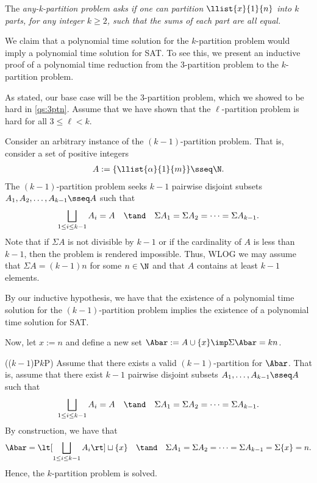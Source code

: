 \documentclass{article}
\begin{document}

\begin{subexercise}
  The \it{any-k-partition problem} asks if one can partition \( \llist{x}{1}{n} \) into \( k \) parts, for any integer \( k \geq 2 \), such that the sums of each part are all equal.
\end{subexercise}

\begin{solution}
  We claim that a polynomial time solution for the \( k \)-partition problem would imply a polynomial time solution for SAT.
  To see this, we present an inductive proof of a polynomial time reduction from the 3-partition problem to the \( k \)-partition problem.

  As stated, our base case will be the 3-partition problem, which we showed to be hard in \ref{qs:3ptn}.
  Assume that we have shown that the \( \ell \)-partition problem is hard for all \( 3\leq\ell < k \).

  Consider an arbitrary instance of the \( (k-1) \)-partition problem.
  That is, consider a set of positive integers \begin{align*}
    A := \{\llist{\alpha}{1}{m}\} \sseq \N.
  \end{align*}
  The \( (k-1) \)-partition problem seeks \( k-1 \) pairwise disjoint subsets \( A_1,A_2,\ldots,A_{k-1}\sseq A \) such that \begin{align*}
    \bigsqcup_{1\leq i \leq k-1}A_{i} = A \quad \tand \quad \Sigma A_1 = \Sigma A_2 = \cdots = \Sigma A_{k-1}.
  \end{align*}
  Note that if \( \Sigma A \) is not divisible by \( k-1 \) or if the cardinality of \( A \) is less than \( k-1 \), then the problem is rendered impossible.
  Thus, WLOG we may assume that \( \Sigma A = (k-1)n \) for some \( n\in \N \) and that \( A \) contains at least \( k-1 \) elements.

  By our inductive hypothesis, we have that the existence of a polynomial time solution for the \( (k-1) \)-partition problem implies the existence of a polynomial time solution for SAT.

  Now, let \( x := n \) and define a new set \( \Abar := A\cup \{x\}\imp \Sigma \Abar = kn \).

  \begin{subproof}[Correctness.]
    ((\( k-1 \))P\imp \( k \)P)
    Assume that there exists a valid \( (k-1) \)-partition for \( \Abar \).
    That is, assume that there exist \( k-1 \) pairwise disjoint subsets \( A_1,\ldots,A_{k-1}\sseq A \) such that \begin{align*}
      \bigsqcup_{1\leq i \leq k-1}A_{i} = A \quad \tand \quad \Sigma A_1 = \Sigma A_2 = \cdots = \Sigma A_{k-1}.
    \end{align*}
    By construction, we have that \begin{align*}
      \Abar = \lt[\bigsqcup_{1\leq i \leq k-1}A_{i}\rt] \sqcup \{x\} \quad \tand \quad \Sigma A_1 = \Sigma A_2 = \cdots = \Sigma A_{k-1} = \Sigma \{x\} = n.
    \end{align*}
    Hence, the \( k \)-partition problem is solved.


\end{subproof}
\end{solution}
\end{document}
